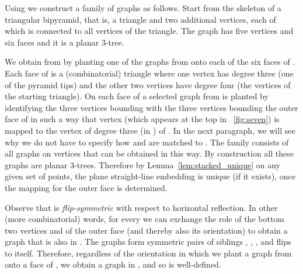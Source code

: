 \documentclass[11pt]{article}
\begin{document}
Using  we construct a family  of graphs as follows.
Start from the skeleton  of a triangular bipyramid, that is, a triangle and
two additional vertices, each of which is connected to all vertices of the
triangle. The graph  has five vertices and six faces and it is a planar
3-tree.

We obtain  from  by planting one of the graphs from
 onto each of the six faces of . Each face of  is a
(combinatorial) triangle where one vertex has degree three (one of the pyramid
tips) and the other two vertices have degree four (the vertices of the starting
triangle). On each face  of  a selected graph  from  is
planted by identifying the three vertices bounding  with the three vertices
bounding the outer face of  in such a way that vertex  (which appears at
the top in \figurename~\ref{fig:seven}) is mapped to the vertex of degree three
(in ) of . In the next paragraph, we will see why we do not have to
specify how  and  are matched to . The family  consists of
all graphs on  vertices that can be obtained in this way. By
construction all these graphs are planar 3-trees. Therefore by
Lemma~\ref{lem:stacked_unique} on any given set of  points, the plane
straight-line embedding is unique (if it exists), once the mapping for the outer
face is determined.

Observe that  is \emph{flip-symmetric} with respect to horizontal
reflection. In other (more combinatorial) words, for every  we
can exchange the role of the bottom two vertices  and  of the outer face
(and thereby also its orientation) to obtain a graph that is also in
. The graphs form symmetric pairs of siblings ,
, , and  flips to itself. Therefore, regardless of
the orientation in which we plant a graph from  onto a face of ,
we obtain a graph in , and so  is well-defined.
\end{document}
